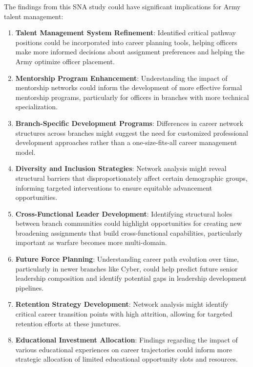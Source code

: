 \documentclass[
  letterpaper,
  DIV=11,
  numbers=noendperiod]{scrartcl}
\begin{document}
The findings from this SNA study could have significant implications for
Army talent management:

\begin{enumerate}
\def\labelenumi{\arabic{enumi}.}
\item
  \textbf{Talent Management System Refinement}: Identified critical
  pathway positions could be incorporated into career planning tools,
  helping officers make more informed decisions about assignment
  preferences and helping the Army optimize officer placement.
\item
  \textbf{Mentorship Program Enhancement}: Understanding the impact of
  mentorship networks could inform the development of more effective
  formal mentorship programs, particularly for officers in branches with
  more technical specialization.
\item
  \textbf{Branch-Specific Development Programs}: Differences in career
  network structures across branches might suggest the need for
  customized professional development approaches rather than a
  one-size-fits-all career management model.
\item
  \textbf{Diversity and Inclusion Strategies}: Network analysis might
  reveal structural barriers that disproportionately affect certain
  demographic groups, informing targeted interventions to ensure
  equitable advancement opportunities.
\item
  \textbf{Cross-Functional Leader Development}: Identifying structural
  holes between branch communities could highlight opportunities for
  creating new broadening assignments that build cross-functional
  capabilities, particularly important as warfare becomes more
  multi-domain.
\item
  \textbf{Future Force Planning}: Understanding career path evolution
  over time, particularly in newer branches like Cyber, could help
  predict future senior leadership composition and identify potential
  gaps in leadership development pipelines.
\item
  \textbf{Retention Strategy Development}: Network analysis might
  identify critical career transition points with high attrition,
  allowing for targeted retention efforts at these junctures.
\item
  \textbf{Educational Investment Allocation}: Findings regarding the
  impact of various educational experiences on career trajectories could
  inform more strategic allocation of limited educational opportunity
  slots and resources.
\end{enumerate}
\end{document}
